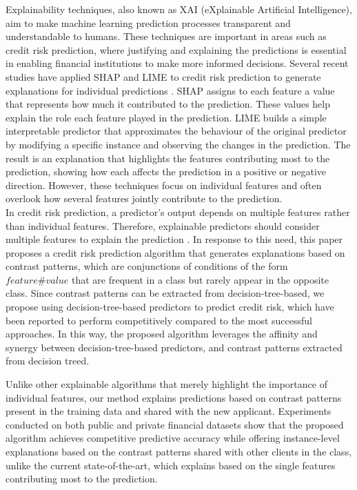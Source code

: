     Explainability techniques, also known as XAI (eXplainable Artificial Intelligence), aim to make machine learning prediction processes transparent and understandable to humans. These techniques are important in areas such as credit risk prediction, where justifying and explaining the predictions is essential in enabling financial institutions to make more informed decisions. Several recent studies have applied SHAP \cite{lundberg2017unified} and LIME \cite{ribeiro2016should} to credit risk prediction to generate explanations for individual predictions \cite{garcia2025machine, baisholan2025fraudx, alonso2025should}. SHAP assigns to each feature a value that represents how much it contributed to the prediction. These values help explain the role each feature played in the prediction. LIME builds a simple interpretable predictor that approximates the behaviour of the original predictor by modifying a specific instance and observing the changes in the prediction. The result is an explanation that highlights the features contributing most to the prediction, showing how each affects the prediction in a positive or negative direction. However, these techniques focus on individual features and often overlook how several features jointly contribute to the prediction. \\

    In credit risk prediction, a predictor's output depends on multiple features rather than individual features. Therefore, explainable predictors should consider multiple features to explain the prediction \cite{zhang2025method, do2024explainable}. In response to this need, this paper proposes a credit risk prediction algorithm that generates explanations based on contrast patterns, which are conjunctions of conditions of the form $feature \# value$ that are frequent in a class but rarely appear in the opposite class. Since contrast patterns can be extracted from decision-tree-based, we propose using decision-tree-based predictors to predict credit risk, which have been reported  to perform competitively compared to the most successful approaches. In this way, the proposed algorithm leverages the affinity and synergy between decision-tree-based predictors, and contrast patterns extracted from decision treed. \newline
    
    Unlike other explainable algorithms that merely highlight the importance of individual features, our method explains predictions based on contrast patterns present in the training data and shared with the new applicant. Experiments conducted on both public and private financial datasets show that the proposed algorithm achieves competitive predictive accuracy while offering instance-level explanations based on the contrast patterns shared with other clients in the class, unlike the current state-of-the-art, which explains based on the single features contributing most to the prediction.\\
	
